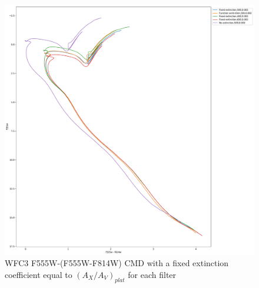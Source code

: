 \documentclass[12pt, a4paper]{report}
\begin{document}
\begin{figure}[h]
\begin{center}
\includegraphics[scale=0.3]{../basti_isochrones_10_13Gyr/Extinction_T50k_FeH0fix_func_f555w_f555wmf814w_500_400_600_Myr_FeH_0p002_ref_noext_Av_1p0.pdf}
\caption{WFC3 F555W-(F555W-F814W) CMD with a fixed extinction coefficient equal to $(A_{X}/A_{V})_{plat}$ for each filter}
\label{wfc3_isoc1_T50k}
\end{center}
\end{figure}
\end{document}
